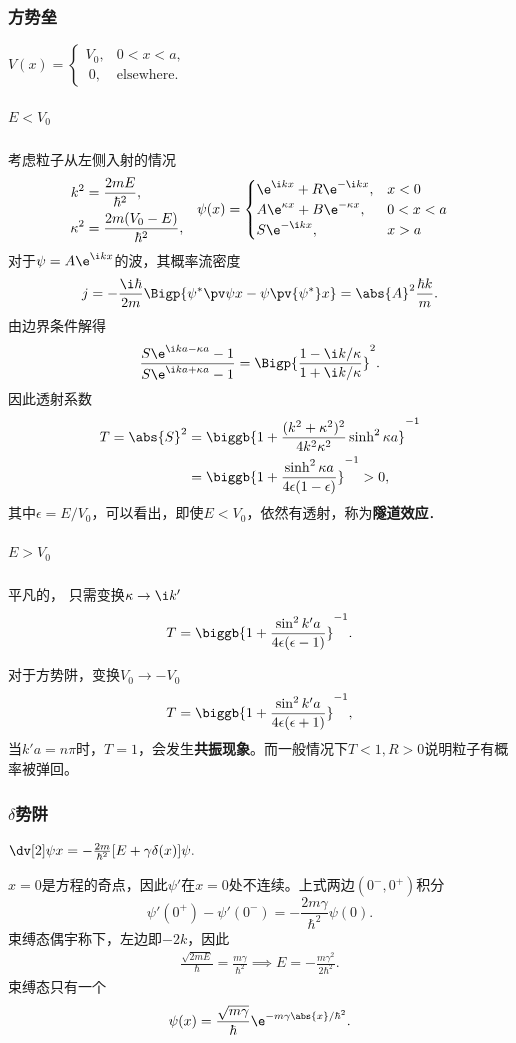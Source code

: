 \subsubsection*{方势垒}
\begin{center}
	$V(x)=\begin{cases}
			V_0, & 0<x<a,            \\
			~0,  & \text{elsewhere.}
		\end{cases}$
\end{center}
\subparagraph*{$E<V_0$}考虑粒子从左侧入射的情况
\begin{align*}
	\begin{aligned}
		k^2      & =\frac{2mE}{\hbar^2},       \\
		\kappa^2 & =\frac{2m(V_0-E)}{\hbar^2},
	\end{aligned}\quad
	\psi(x)=\begin{cases}
		\e^{\i kx}+R\e^{-\i kx},        & x<0   \\
		A\e^{\kappa x}+B\e^{-\kappa x}, & 0<x<a \\
		S\e^{-\i kx},                  & x>a
	\end{cases}
\end{align*}
对于$\psi=A\e^{\i kx}$的波，其概率流密度
\[
	j=-\frac{\i\hbar}{2m}\Bigp{\psi^*\pv\psi{x}-\psi\pv{\psi^*}x}=\abs{A}^2\frac{\hbar k}m.
\]
由边界条件解得
\[
	\frac{S\e^{\i ka-\kappa a}-1}{S\e^{\i ka+\kappa a}-1}=\Bigp{\frac{1-\i k/\kappa}{1+\i k/\kappa}}^2.
\]
因此透射系数
\begin{align}\notag
	T=\abs{S}^2 & =\biggb{1+\frac{(k^2+\kappa^2)^2}{4k^2\kappa^2}\sinh^2\kappa a}^{-1} \\
	            & =\biggb{1+\frac{\sinh^2\kappa a}{4\epsilon(1-\epsilon)}}^{-1}>0,
\end{align}
其中$\epsilon=E/V_0$，可以看出，即使$E<V_0$，依然有透射，称为\textbf{隧道效应}．
\subparagraph*{$E>V_0$}平凡的，
只需变换$\kappa\to\i k'$
\[
	T=\biggb{1+\frac{\sin^2k'a}{4\epsilon(\epsilon-1)}}^{-1}.
\]

对于方势阱，变换$V_0\to-V_0$
\[
	T=\biggb{1+\frac{\sin^2k'a}{4\epsilon(\epsilon+1)}}^{-1},
\]
当$k'a=n\pi$时，$T=1$，会发生\textbf{共振现象}。而一般情况下$T<1,R>0$说明粒子有概率被弹回。
\subsubsection*{$\delta$势阱}
\begin{center}
	$\dv[2]\psi{x}=-\frac{2m}{\hbar^2}[E+\gamma\delta(x)]\psi.$
\end{center}
$x=0$是方程的奇点，因此$\psi'$在$x=0$处不连续。上式两边$(0^-,0^+)$积分
\[
	\psi'(0^+)-\psi'(0^-)=-\frac{2m\gamma}{\hbar^2}\psi(0).
\]
束缚态偶宇称下，左边即$-2k$，因此
\begin{align}
	\frac{\sqrt{2mE}}\hbar=\frac{m\gamma}{\hbar^2}\implies E=-\frac{m\gamma^2}{2\hbar^2}.
\end{align}
束缚态只有一个
\begin{align}
	\psi(x)=\frac{\sqrt{m\gamma}}\hbar\e^{-m\gamma\abs{x}/\hbar^2}.
\end{align}
